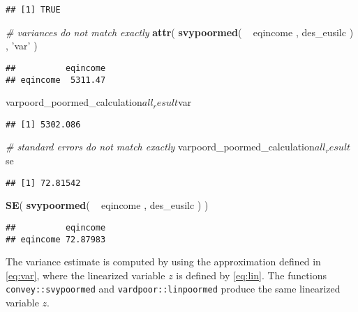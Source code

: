 \documentclass[]{book}
\newenvironment{Shaded}{\begin{snugshade}}{\end{snugshade}}
\newcommand{\KeywordTok}[1]{\textcolor[rgb]{0.13,0.29,0.53}{\textbf{{#1}}}}
\newcommand{\StringTok}[1]{\textcolor[rgb]{0.31,0.60,0.02}{{#1}}}
\newcommand{\CommentTok}[1]{\textcolor[rgb]{0.56,0.35,0.01}{\textit{{#1}}}}
\newcommand{\NormalTok}[1]{{#1}}
\theoremstyle{definition}
\theoremstyle{definition}
\theoremstyle{remark}
\begin{document}
\begin{verbatim}
## [1] TRUE
\end{verbatim}

\begin{Shaded}
\begin{Highlighting}[]
\CommentTok{# variances do not match exactly}
\KeywordTok{attr}\NormalTok{( }\KeywordTok{svypoormed}\NormalTok{( ~}\StringTok{ }\NormalTok{eqincome , des_eusilc ) , }\StringTok{'var'} \NormalTok{)}
\end{Highlighting}
\end{Shaded}

\begin{verbatim}
##          eqincome
## eqincome  5311.47
\end{verbatim}

\begin{Shaded}
\begin{Highlighting}[]
\NormalTok{varpoord_poormed_calculation$all_result$var}
\end{Highlighting}
\end{Shaded}

\begin{verbatim}
## [1] 5302.086
\end{verbatim}

\begin{Shaded}
\begin{Highlighting}[]
\CommentTok{# standard errors do not match exactly}
\NormalTok{varpoord_poormed_calculation$all_result$se}
\end{Highlighting}
\end{Shaded}

\begin{verbatim}
## [1] 72.81542
\end{verbatim}

\begin{Shaded}
\begin{Highlighting}[]
\KeywordTok{SE}\NormalTok{( }\KeywordTok{svypoormed}\NormalTok{( ~}\StringTok{ }\NormalTok{eqincome , des_eusilc ) )}
\end{Highlighting}
\end{Shaded}

\begin{verbatim}
##          eqincome
## eqincome 72.87983
\end{verbatim}

The variance estimate is computed by using the approximation defined in
\eqref{eq:var}, where the linearized variable \(z\) is defined by
\eqref{eq:lin}. The functions \texttt{convey::svypoormed} and
\texttt{vardpoor::linpoormed} produce the same linearized variable
\(z\).
\end{document}
